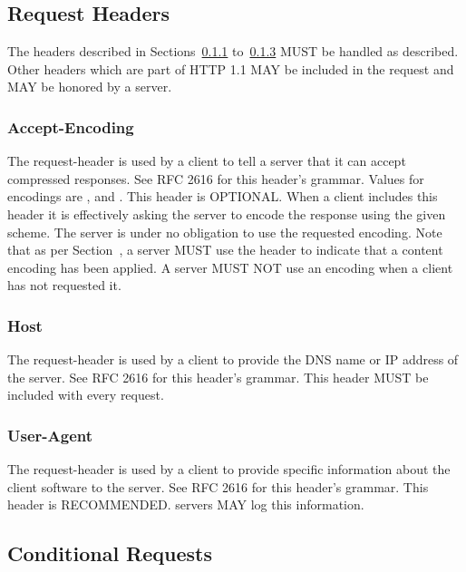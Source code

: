 \documentclass[justify]{nasa-ese}
\begin{document}
\subsection{Request Headers}

The headers described in Sections~\ref{sec-accept-encoding}
to~\ref{sec-user-agent} MUST be handled as described. Other headers which
are part of \ac{HTTP} 1.1 MAY be included in the request and MAY be honored
by a \DAP server.

\subsubsection{Accept-Encoding}
\label{sec-accept-encoding}
The  request-header is used by a \DAP client to
tell a server that it can accept compressed responses. See RFC
2616\cite{rfc2616} for this header's grammar. Values for encodings
are ,  and . This header is
OPTIONAL. When a client includes this header it is effectively asking
the \DAP server to encode the response using the given scheme. The
server is under no obligation to use the requested encoding. Note that
as per Section~, a server MUST use the
 header to indicate that a content encoding has
been applied. A server MUST NOT use an encoding when a client has not
requested it.

\subsubsection{Host}
\label{sec-host}
The  request-header is used by a \DAP client to provide the 
DNS name or IP address of the \DAP server. See RFC 2616\cite{rfc2616}
for this header's grammar. This header MUST be included with every request.

\subsubsection{User-Agent}
\label{sec-user-agent}
The  request-header is used by a \DAP client to
provide specific information about the client software to the \DAP
server. See RFC 2616\cite{rfc2616} for this header's grammar. This header is
RECOMMENDED. \DAP servers MAY log this information.

\subsection{Conditional Requests}
\label{sec:conditional-requests}
\end{document}
